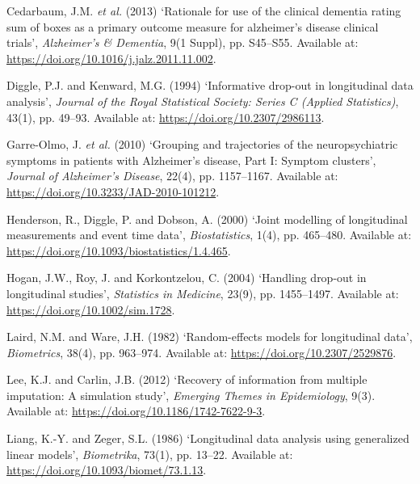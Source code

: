 \documentclass[
  9pt,
  letterpaper,
  DIV=11,
  numbers=noendperiod]{scrartcl}
\newlength{\cslhangindent}
\newenvironment{CSLReferences}[2] %
 {\begin{list}{}{%
  \setlength{\itemindent}{0pt}
  \setlength{\leftmargin}{0pt}
  \setlength{\parsep}{0pt}
  \ifodd #1
   \setlength{\leftmargin}{\cslhangindent}
   \setlength{\itemindent}{-1\cslhangindent}
  \fi
  \setlength{\itemsep}{#2\baselineskip}}}
 {\end{list}}
\begin{document}
\label{refs}
\begin{CSLReferences}{0}{1}
Cedarbaum, J.M. \emph{et al.} (2013) {`Rationale for use of the clinical
dementia rating sum of boxes as a primary outcome measure for
alzheimer's disease clinical trials'}, \emph{Alzheimer's \& Dementia},
9(1 Suppl), pp. S45--S55. Available at:
\url{https://doi.org/10.1016/j.jalz.2011.11.002}.

Diggle, P.J. and Kenward, M.G. (1994) {`Informative drop-out in
longitudinal data analysis'}, \emph{Journal of the Royal Statistical
Society: Series C (Applied Statistics)}, 43(1), pp. 49--93. Available
at: \url{https://doi.org/10.2307/2986113}.

Garre-Olmo, J. \emph{et al.} (2010) {`Grouping and trajectories of the
neuropsychiatric symptoms in patients with {Alzheimer}'s disease, {Part
I}: Symptom clusters'}, \emph{Journal of Alzheimer's Disease}, 22(4),
pp. 1157--1167. Available at:
\url{https://doi.org/10.3233/JAD-2010-101212}.

Henderson, R., Diggle, P. and Dobson, A. (2000) {`Joint modelling of
longitudinal measurements and event time data'}, \emph{Biostatistics},
1(4), pp. 465--480. Available at:
\url{https://doi.org/10.1093/biostatistics/1.4.465}.

Hogan, J.W., Roy, J. and Korkontzelou, C. (2004) {`Handling drop-out in
longitudinal studies'}, \emph{Statistics in Medicine}, 23(9), pp.
1455--1497. Available at: \url{https://doi.org/10.1002/sim.1728}.

Laird, N.M. and Ware, J.H. (1982) {`Random-effects models for
longitudinal data'}, \emph{Biometrics}, 38(4), pp. 963--974. Available
at: \url{https://doi.org/10.2307/2529876}.

Lee, K.J. and Carlin, J.B. (2012) {`Recovery of information from
multiple imputation: A simulation study'}, \emph{Emerging Themes in
Epidemiology}, 9(3). Available at:
\url{https://doi.org/10.1186/1742-7622-9-3}.

Liang, K.-Y. and Zeger, S.L. (1986) {`Longitudinal data analysis using
generalized linear models'}, \emph{Biometrika}, 73(1), pp. 13--22.
Available at: \url{https://doi.org/10.1093/biomet/73.1.13}.


\end{CSLReferences}
\end{document}
